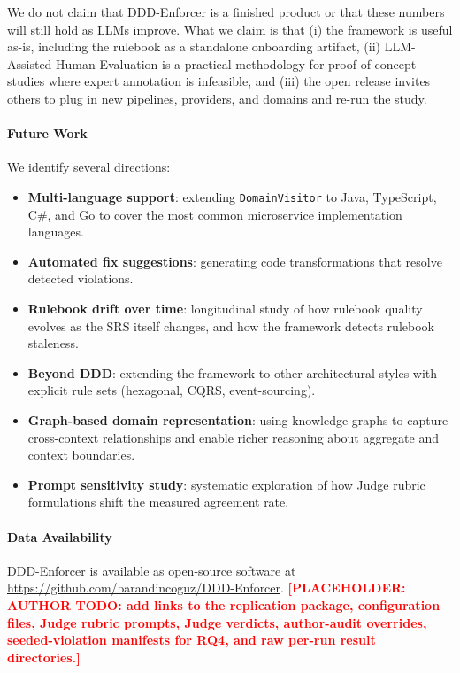 \documentclass[smallextended]{svjour3}
\newcommand{\placeholder}[1]{\textcolor{red}{\textbf{[PLACEHOLDER: #1]}}}
\begin{document}
We do not claim that DDD-Enforcer is a finished product or that these numbers will still hold as LLMs improve.
What we claim is that (i) the framework is useful as-is, including the rulebook as a standalone onboarding artifact, (ii) LLM-Assisted Human Evaluation is a practical methodology for proof-of-concept studies where expert annotation is infeasible, and (iii) the open release invites others to plug in new pipelines, providers, and domains and re-run the study.

\paragraph{Future Work}
We identify several directions:
\begin{itemize}
    \item \textbf{Multi-language support}: extending \texttt{DomainVisitor} to Java, TypeScript, C\#, and Go to cover the most common microservice implementation languages.
    \item \textbf{Automated fix suggestions}: generating code transformations that resolve detected violations.
    \item \textbf{Rulebook drift over time}: longitudinal study of how rulebook quality evolves as the SRS itself changes, and how the framework detects rulebook staleness.
    \item \textbf{Beyond DDD}: extending the framework to other architectural styles with explicit rule sets (hexagonal, CQRS, event-sourcing).
    \item \textbf{Graph-based domain representation}: using knowledge graphs to capture cross-context relationships and enable richer reasoning about aggregate and context boundaries.
    \item \textbf{Prompt sensitivity study}: systematic exploration of how Judge rubric formulations shift the measured agreement rate.
\end{itemize}

\paragraph{Data Availability}
DDD-Enforcer is available as open-source software at \url{https://github.com/barandincoguz/DDD-Enforcer}.
\placeholder{AUTHOR TODO: add links to the replication package, configuration files, Judge rubric prompts, Judge verdicts, author-audit overrides, seeded-violation manifests for RQ4, and raw per-run result directories.}


\end{document}
